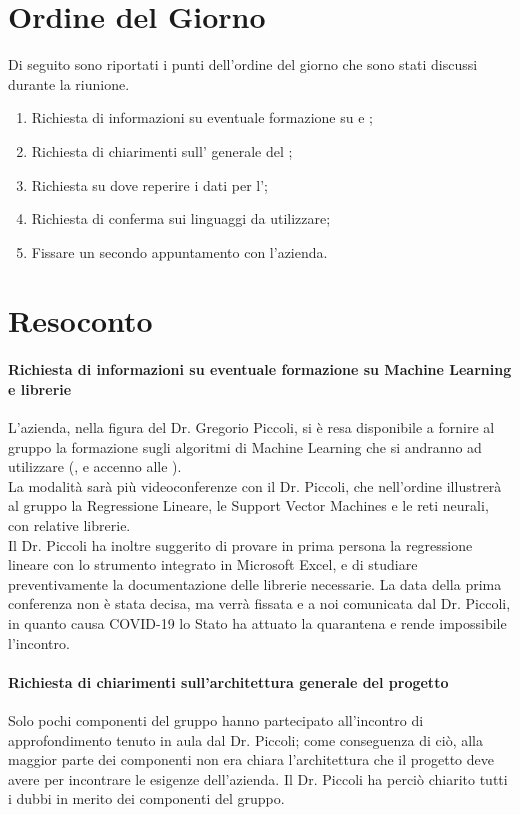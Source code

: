\documentclass{article}
\begin{document}
\section{Ordine del Giorno}%
\label{ordine_del_giorno}
Di seguito sono riportati i punti dell'ordine del giorno che sono stati discussi durante la riunione.
\begin{enumerate}
  \item Richiesta di informazioni su eventuale formazione su  e ;
  \item Richiesta di chiarimenti sull' generale del ;
  \item Richiesta su dove reperire i dati per l';
  \item Richiesta di conferma sui linguaggi da utilizzare;
  \item Fissare un secondo appuntamento con l'azienda.
\end{enumerate}

\section{Resoconto}%
\label{resoconto}
\paragraph*{Richiesta di informazioni su eventuale formazione su Machine Learning e librerie}
L'azienda, nella figura del Dr. Gregorio Piccoli, si è resa disponibile a fornire al gruppo la formazione sugli algoritmi di Machine Learning che si andranno ad utilizzare (,  e accenno alle ). \\
La modalità sarà più videoconferenze con il Dr. Piccoli, che nell'ordine illustrerà al gruppo la Regressione Lineare, le Support Vector Machines e le reti neurali, con relative librerie. \\
Il Dr. Piccoli ha inoltre suggerito di provare in prima persona la regressione lineare con lo strumento integrato in Microsoft Excel, e di studiare preventivamente la documentazione delle librerie necessarie. La data della prima conferenza non è stata decisa, ma verrà fissata e a noi comunicata dal Dr. Piccoli, in quanto causa COVID-19 lo Stato ha attuato la quarantena e rende impossibile l'incontro.

\paragraph*{Richiesta di chiarimenti sull'architettura generale del progetto}
Solo pochi componenti del gruppo hanno partecipato all'incontro di approfondimento tenuto in aula dal Dr. Piccoli; come conseguenza di ciò, alla maggior parte dei componenti non era chiara l'architettura che il progetto deve avere per incontrare le
esigenze dell'azienda. Il Dr. Piccoli ha perciò chiarito tutti i dubbi in merito dei componenti del gruppo.
\end{document}
